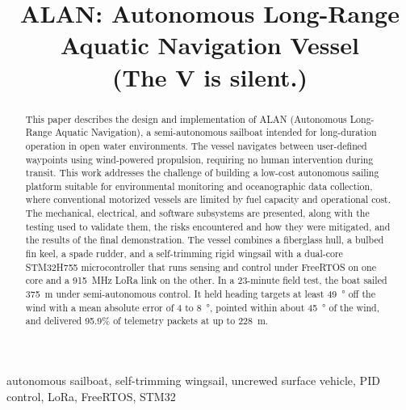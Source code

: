 \documentclass[conference]{IEEEtran}
\begin{document}
\title{ALAN: Autonomous Long-Range Aquatic Navigation Vessel\\{\normalsize (The V is silent.)}}

\author{
}

\maketitle

\begin{abstract}
This paper describes the design and implementation of ALAN (Autonomous
Long-Range Aquatic Navigation), a semi-autonomous sailboat intended for
long-duration operation in open water environments. The vessel navigates
between user-defined waypoints using wind-powered propulsion, requiring no
human intervention during transit. This work addresses the challenge of
building a low-cost autonomous sailing platform suitable for environmental
monitoring and oceanographic data collection, where conventional motorized
vessels are limited by fuel capacity and operational cost. The mechanical,
electrical, and software subsystems are presented, along with the testing
used to validate them, the risks encountered and how they were mitigated, and
the results of the final demonstration. The vessel combines a fiberglass
hull, a bulbed fin keel, a spade rudder, and a self-trimming rigid wingsail
with a dual-core STM32H755 microcontroller that runs sensing and control under
FreeRTOS on one core and a \SI{915}{\mega\hertz} LoRa link on the other.
In a 23-minute field test, the boat sailed \SI{375}{\meter} under
semi-autonomous control. It held heading targets at least \SI{49}{\degree}
off the wind with a mean absolute error of 4 to \SI{8}{\degree}, pointed
within about \SI{45}{\degree} of the wind, and delivered 95.9\% of telemetry
packets at up to \SI{228}{\meter}.
\end{abstract}

\begin{IEEEkeywords}
autonomous sailboat, self-trimming wingsail, uncrewed surface vehicle, PID
control, LoRa, FreeRTOS, STM32
\end{IEEEkeywords}















\appendices



\IEEEtriggercmd{\enlargethispage{\baselineskip}}


\end{document}
